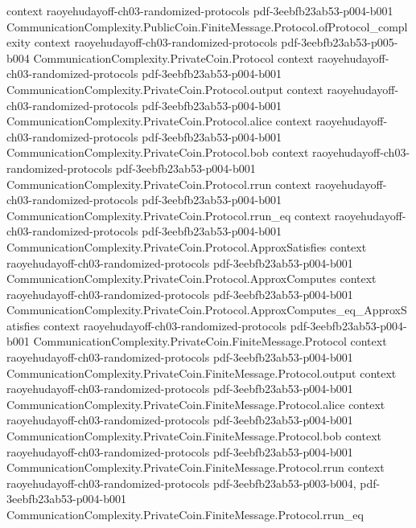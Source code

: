 \begin{theorem}
  {context}
  {raoyehudayoff-ch03-randomized-protocols}
  {pdf-3eebfb23ab53-p004-b001}
\proofstep
  {CommunicationComplexity.PublicCoin.FiniteMessage.Protocol.ofProtocol_complexity}
  {context}
  {raoyehudayoff-ch03-randomized-protocols}
  {pdf-3eebfb23ab53-p005-b004}
\proofstep
  {CommunicationComplexity.PrivateCoin.Protocol}
  {context}
  {raoyehudayoff-ch03-randomized-protocols}
  {pdf-3eebfb23ab53-p004-b001}
\proofstep
  {CommunicationComplexity.PrivateCoin.Protocol.output}
  {context}
  {raoyehudayoff-ch03-randomized-protocols}
  {pdf-3eebfb23ab53-p004-b001}
\proofstep
  {CommunicationComplexity.PrivateCoin.Protocol.alice}
  {context}
  {raoyehudayoff-ch03-randomized-protocols}
  {pdf-3eebfb23ab53-p004-b001}
\proofstep
  {CommunicationComplexity.PrivateCoin.Protocol.bob}
  {context}
  {raoyehudayoff-ch03-randomized-protocols}
  {pdf-3eebfb23ab53-p004-b001}
\proofstep
  {CommunicationComplexity.PrivateCoin.Protocol.rrun}
  {context}
  {raoyehudayoff-ch03-randomized-protocols}
  {pdf-3eebfb23ab53-p004-b001}
\proofstep
  {CommunicationComplexity.PrivateCoin.Protocol.rrun_eq}
  {context}
  {raoyehudayoff-ch03-randomized-protocols}
  {pdf-3eebfb23ab53-p004-b001}
\proofstep
  {CommunicationComplexity.PrivateCoin.Protocol.ApproxSatisfies}
  {context}
  {raoyehudayoff-ch03-randomized-protocols}
  {pdf-3eebfb23ab53-p004-b001}
\proofstep
  {CommunicationComplexity.PrivateCoin.Protocol.ApproxComputes}
  {context}
  {raoyehudayoff-ch03-randomized-protocols}
  {pdf-3eebfb23ab53-p004-b001}
\proofstep
  {CommunicationComplexity.PrivateCoin.Protocol.ApproxComputes_eq_ApproxSatisfies}
  {context}
  {raoyehudayoff-ch03-randomized-protocols}
  {pdf-3eebfb23ab53-p004-b001}
\proofstep
  {CommunicationComplexity.PrivateCoin.FiniteMessage.Protocol}
  {context}
  {raoyehudayoff-ch03-randomized-protocols}
  {pdf-3eebfb23ab53-p004-b001}
\proofstep
  {CommunicationComplexity.PrivateCoin.FiniteMessage.Protocol.output}
  {context}
  {raoyehudayoff-ch03-randomized-protocols}
  {pdf-3eebfb23ab53-p004-b001}
\proofstep
  {CommunicationComplexity.PrivateCoin.FiniteMessage.Protocol.alice}
  {context}
  {raoyehudayoff-ch03-randomized-protocols}
  {pdf-3eebfb23ab53-p004-b001}
\proofstep
  {CommunicationComplexity.PrivateCoin.FiniteMessage.Protocol.bob}
  {context}
  {raoyehudayoff-ch03-randomized-protocols}
  {pdf-3eebfb23ab53-p004-b001}
\proofstep
  {CommunicationComplexity.PrivateCoin.FiniteMessage.Protocol.rrun}
  {context}
  {raoyehudayoff-ch03-randomized-protocols}
  {pdf-3eebfb23ab53-p003-b004,
    pdf-3eebfb23ab53-p004-b001}
\proofstep
  {CommunicationComplexity.PrivateCoin.FiniteMessage.Protocol.rrun_eq}

\end{theorem}
